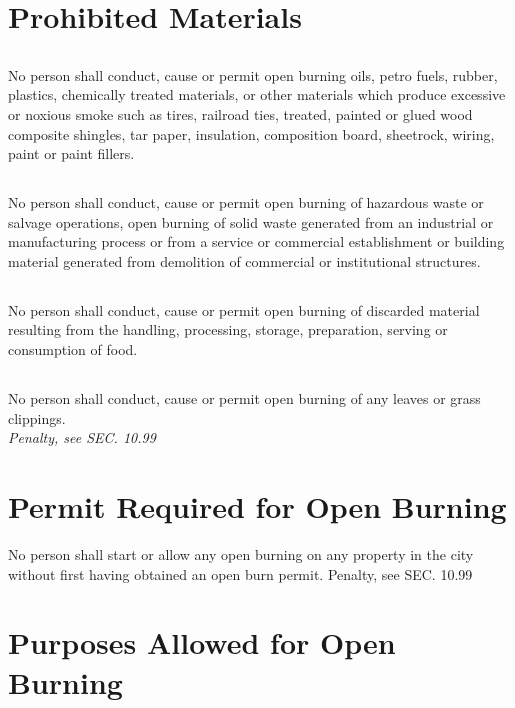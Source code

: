 \section{Prohibited Materials}
\subsection{}
No person shall conduct, cause or permit open burning oils, petro fuels, rubber, plastics, chemically treated materials, or other materials which produce excessive or noxious smoke such as tires, railroad ties, treated, painted or glued wood composite shingles, tar paper, insulation, composition board, sheetrock, wiring, paint or paint fillers.
\subsection{}
No person shall conduct, cause or permit open burning of hazardous waste or salvage operations, open burning of solid waste generated from an industrial or manufacturing process or from a service or commercial establishment or building material generated from demolition of commercial or institutional structures.
\subsection{}
No person shall conduct, cause or permit open burning of discarded material resulting from the handling, processing, storage, preparation, serving or consumption of food.
\subsection{}
No person shall conduct, cause or permit open burning of any leaves or grass clippings.\\
\emph{Penalty, see SEC. 10.99}
\section{Permit Required for Open Burning}
No person shall start or allow any open burning on any property in the city without first having obtained an open burn permit.
Penalty, see SEC. 10.99
\section{Purposes Allowed for Open Burning}
